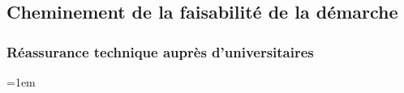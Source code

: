 \clearpage

\subsection*{Cheminement de la faisabilité de la démarche}

\subsubsection*{Réassurance technique auprès d'universitaires}

\begingroup
\StyledTableSetup
{}
\emergencystretch=1em
\newcommand{\AlignedCell}[1]{\begin{minipage}[t]{\linewidth}\vspace{0pt}\RaggedRight #1\end{minipage}}
\newcommand{\AlignedBullets}[1]{\begin{minipage}[t]{\linewidth}\vspace{0pt}\begin{itemize}[leftmargin=1.15em, nosep, topsep=0pt, partopsep=0pt, parsep=0pt, itemsep=0pt]#1\end{itemize}\end{minipage}}
